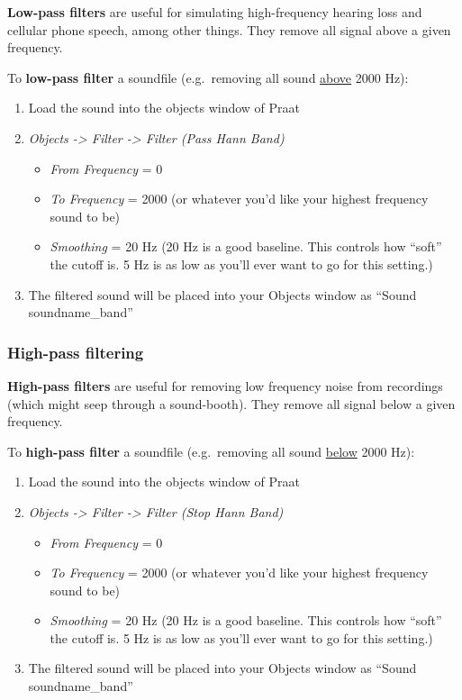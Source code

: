 \documentclass[11pt]{article}
\def\tightlist{}
\begin{document}
\textbf{Low-pass filters} are useful for simulating high-frequency
hearing loss and cellular phone speech, among other things. They remove
all signal above a given frequency.

To \textbf{low-pass filter} a soundfile (e.g.~removing all sound
\underline{above} 2000 Hz):

\begin{enumerate}
\def\labelenumi{\arabic{enumi}.}
\tightlist
\item
  Load the sound into the objects window of Praat
\item
  \emph{Objects -\textgreater{} Filter -\textgreater{} Filter (Pass Hann
  Band)}

  \begin{itemize}
  \tightlist
  \item
    \emph{From Frequency} = 0
  \item
    \emph{To Frequency} = 2000 (or whatever you'd like your highest
    frequency sound to be)
  \item
    \emph{Smoothing} = 20 Hz (20 Hz is a good baseline. This controls
    how ``soft'' the cutoff is. 5 Hz is as low as you'll ever want to go
    for this setting.)
  \end{itemize}
\item
  The filtered sound will be placed into your Objects window as ``Sound
  soundname\_band''
\end{enumerate}

\hypertarget{high-pass-filtering}{%
\subsubsection{High-pass filtering}\label{high-pass-filtering}}

\textbf{High-pass filters} are useful for removing low frequency noise
from recordings (which might seep through a sound-booth). They remove
all signal below a given frequency.

To \textbf{high-pass filter} a soundfile (e.g.~removing all sound
\underline{below} 2000 Hz):

\begin{enumerate}
\def\labelenumi{\arabic{enumi}.}
\tightlist
\item
  Load the sound into the objects window of Praat
\item
  \emph{Objects -\textgreater{} Filter -\textgreater{} Filter (Stop Hann
  Band)}

  \begin{itemize}
  \tightlist
  \item
    \emph{From Frequency} = 0
  \item
    \emph{To Frequency} = 2000 (or whatever you'd like your highest
    frequency sound to be)
  \item
    \emph{Smoothing} = 20 Hz (20 Hz is a good baseline. This controls
    how ``soft'' the cutoff is. 5 Hz is as low as you'll ever want to go
    for this setting.)
  \end{itemize}
\item
  The filtered sound will be placed into your Objects window as ``Sound
  soundname\_band''
\end{enumerate}
\end{document}
